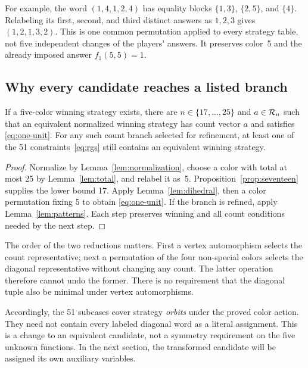 For example, the word $(1,4,1,2,4)$ has equality blocks
$\{1,3\}$, $\{2,5\}$, and $\{4\}$. Relabeling its first, second, and
third distinct answers as $1,2,3$ gives $(1,2,1,3,2)$.
This is one common permutation applied to every strategy table, not five
independent changes of the players' answers. It preserves color~5 and
the already imposed answer $f_1(5,5)=1$.

\subsection{Why every candidate reaches a listed branch}
\begin{proposition}\label{prop:coverage}
If a five-color winning strategy exists, there are
$n\in\{17,\ldots,25\}$ and $a\in\mathcal{R}_n$ such that an equivalent
normalized winning strategy has count vector $a$ and satisfies
\eqref{eq:one-unit}. For any such count branch selected for refinement,
at least one of the 51 constraints~\eqref{eq:rgs} still contains an
equivalent winning strategy.
\end{proposition}
\begin{proof}
Normalize by Lemma~\ref{lem:normalization}, choose a color with total at
most 25 by Lemma~\ref{lem:total}, and relabel it as~5.
Proposition~\ref{prop:seventeen} supplies the lower bound 17. Apply
Lemma~\ref{lem:dihedral}, then a color permutation fixing 5 to obtain
\eqref{eq:one-unit}. If the branch is refined, apply
Lemma~\ref{lem:patterns}. Each step preserves winning and all count
conditions needed by the next step.
\end{proof}

The order of the two reductions matters. First a vertex automorphism
selects the count representative; next a permutation of the four
non-special colors selects the diagonal representative without changing
any count. The latter operation therefore cannot undo the former. There
is no requirement that the diagonal tuple also be minimal under vertex
automorphisms.

Accordingly, the 51 subcases cover strategy \emph{orbits} under the proved
color action. They need not contain every labeled diagonal word as a
literal assignment. This is a change to an equivalent candidate, not a
symmetry requirement on the five unknown functions. In the next section,
the transformed candidate will be assigned its own auxiliary variables.

